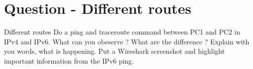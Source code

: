 \section{Question - Different routes}

\begin{questionBox}{Different routes}
    Do a ping and traceroute command between PC1 and PC2 in IPv4 and IPv6. What can you obeserve ? What are the difference ? Explain with you words, what is happening. Put a Wireshark screenshot and highlight important information from the IPv6 ping.    
\end{questionBox}
